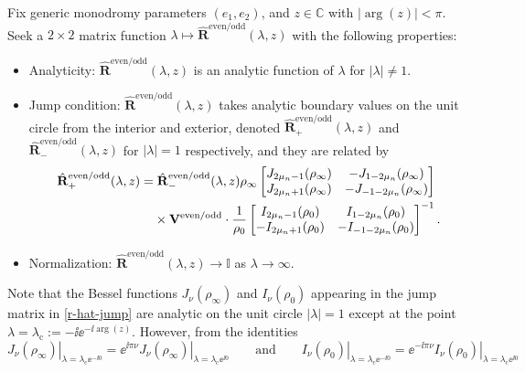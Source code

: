 \begin{rhp}
Fix generic monodromy parameters $( e_1, e_2)$, and $z\in\mathbb{C}$ with $|{\arg}(z)|<\pi$. Seek a $2\times 2$ matrix function $\lambda\mapsto\hat{\mathbf{R}}^\mathrm{even/odd}(\lambda,z)$ with the following properties:
\begin{itemize}\itemsep=0pt
 \item Analyticity: $\hat{\mathbf{R}}^\mathrm{even/odd}(\lambda,z)$ is an analytic function of $\lambda$ for $|\lambda|\neq 1$.
 \item Jump condition:
 $\hat{\mathbf{R}}^\mathrm{even/odd}(\lambda,z)$ takes analytic boundary values on the unit circle from the interior and exterior, denoted $\hat{\mathbf{R}}^\mathrm{even/odd}_+(\lambda,z)$ and $\hat{\mathbf{R}}^\mathrm{even/odd}_-(\lambda,z)$ for $|\lambda|=1$ respectively, and they are related by
 \begin{align}
 &\hat{\mathbf{R}}^\mathrm{even/odd}_+(\lambda,z)=\hat{\mathbf{R}}^\mathrm{even/odd}_-(\lambda,z) {\rho_\infty}\begin{bmatrix}J_{2\mu_n - 1}(\rho_\infty) & -J_{1- 2\mu_n}(\rho_\infty)\\
 J_{2\mu_n +1}(\rho_\infty) & -J_{-1-2\mu_n}(\rho_\infty)\end{bmatrix}\nonumber\\
 & \hphantom{\hat{\mathbf{R}}^\mathrm{even/odd}_+(\lambda,z)=}{}
 \times\mathbf{V}^\mathrm{even/odd}
 \cdot \dfrac{1}{\rho_0}\begin{bmatrix}I_{2\mu_n - 1}(\rho_0) & I_{1- 2\mu_n}(\rho_0)\\
 -I_{2\mu_n +1}(\rho_0) & -I_{-1-2\mu_n}(\rho_0)\end{bmatrix}^{-1}.\label{r-hat-jump}
 \end{align}
 \item Normalization:
 $\hat{\mathbf{R}}^\mathrm{even/odd}(\lambda,z)\to\mathbb{I}$ as $\lambda\to\infty$.
\end{itemize}
\label{rhp:Rhat-even/odd}
\end{rhp}
Note that the Bessel functions $J_\nu(\rho_\infty)$ and $I_\nu(\rho_0)$ appearing in the jump matrix in \eqref{r-hat-jump} are analytic on the unit circle $|\lambda|=1$ except at the point $\lambda=\lambda_\mathrm{c}:=-\ii\ee^{-\ii\arg(z)}$. However, from the identities
\[
\left.J_\nu(\rho_\infty)\right|_{\lambda=\lambda_\mathrm{c}\ee^{-\ii 0}}=\ee^{\ii\pi\nu}\left.J_\nu(\rho_\infty)\right|_{\lambda=\lambda_\mathrm{c}\ee^{\ii 0}} \qquad \text{and} \qquad
\left.I_\nu(\rho_0)\right|_{\lambda=\lambda_\mathrm{c}\ee^{-\ii 0}}=\ee^{-\ii\pi\nu}\left.I_\nu(\rho_0)\right|_{\lambda=\lambda_\mathrm{c}\ee^{\ii 0}}
\]
